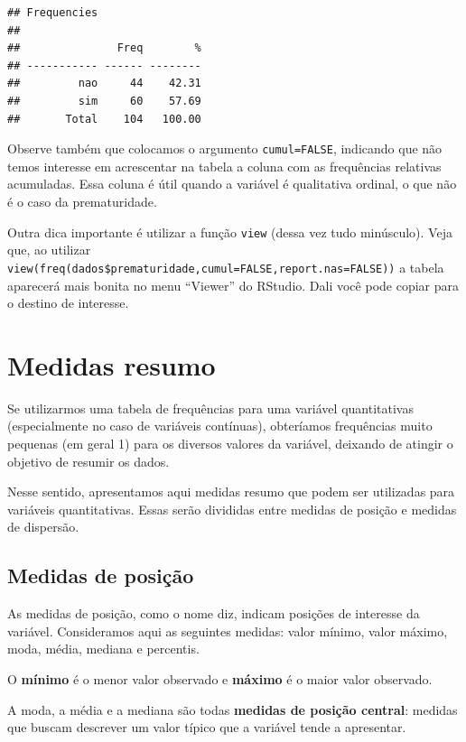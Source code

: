\documentclass[
]{book}
\begin{document}
\begin{verbatim}
## Frequencies  
## 
##               Freq        %
## ----------- ------ --------
##         nao     44    42.31
##         sim     60    57.69
##       Total    104   100.00
\end{verbatim}

Observe também que colocamos o argumento \texttt{cumul=FALSE}, indicando que não temos interesse em acrescentar na tabela a coluna com as frequências relativas acumuladas. Essa coluna é útil quando a variável é qualitativa ordinal, o que não é o caso da prematuridade.

Outra dica importante é utilizar a função \texttt{view} (dessa vez tudo minúsculo). Veja que, ao utilizar \texttt{view(freq(dados\$prematuridade,cumul=FALSE,report.nas=FALSE))} a tabela aparecerá mais bonita no menu ``Viewer'' do RStudio. Dali você pode copiar para o destino de interesse.

\hypertarget{medidas-resumo}{%
\section{Medidas resumo}\label{medidas-resumo}}

Se utilizarmos uma tabela de frequências para uma variável quantitativas (especialmente no caso de variáveis contínuas), obteríamos frequências muito pequenas (em geral 1) para os diversos valores da variável, deixando de atingir o objetivo de resumir os dados.

Nesse sentido, apresentamos aqui medidas resumo que podem ser utilizadas para variáveis quantitativas. Essas serão divididas entre medidas de posição e medidas de dispersão.

\hypertarget{medidas-de-posiuxe7uxe3o}{%
\subsection{Medidas de posição}\label{medidas-de-posiuxe7uxe3o}}

As medidas de posição, como o nome diz, indicam posições de interesse da variável. Consideramos aqui as seguintes medidas: valor mínimo, valor máximo, moda, média, mediana e percentis.

O \textbf{mínimo} é o menor valor observado e \textbf{máximo} é o maior valor observado.

A moda, a média e a mediana são todas \textbf{medidas de posição central}: medidas que buscam descrever um valor típico que a variável tende a apresentar.
\end{document}
